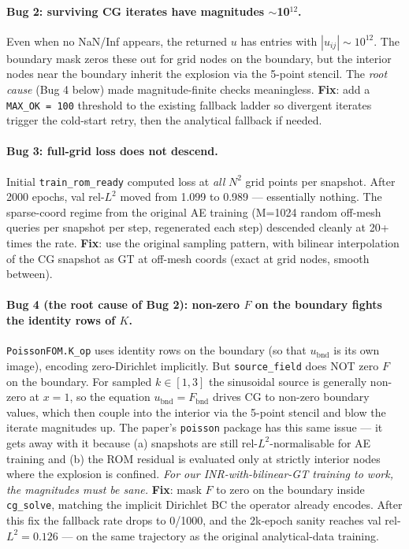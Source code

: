 \documentclass[11pt]{article}
\begin{document}
\paragraph{Bug 2: surviving CG iterates have magnitudes $\sim$10$^{12}$.}
Even when no NaN/Inf appears, the returned $u$ has entries with
$|u_{ij}| \sim 10^{12}$. The boundary mask zeros these out for grid
nodes on the boundary, but the interior nodes near the boundary inherit
the explosion via the 5-point stencil. The \emph{root cause} (Bug 4
below) made magnitude-finite checks meaningless. \textbf{Fix}: add a
\texttt{MAX\_OK = 100} threshold to the existing fallback ladder so
divergent iterates trigger the cold-start retry, then the analytical
fallback if needed.

\paragraph{Bug 3: full-grid loss does not descend.}
Initial \texttt{train\_rom\_ready} computed loss at \emph{all} $N^2$
grid points per snapshot. After 2000 epochs, val rel-$L^2$ moved from
1.099 to 0.989 --- essentially nothing. The sparse-coord regime from
the original AE training (M=1024 random off-mesh queries per snapshot
per step, regenerated each step) descended cleanly at 20+ times the
rate. \textbf{Fix}: use the original sampling pattern, with bilinear
interpolation of the CG snapshot as GT at off-mesh coords (exact at
grid nodes, smooth between).

\paragraph{Bug 4 (the root cause of Bug 2): non-zero $F$ on the
boundary fights the identity rows of $K$.}
\texttt{PoissonFOM.K\_op} uses identity rows on the boundary (so that
$u_{\text{bnd}}$ is its own image), encoding zero-Dirichlet implicitly.
But \texttt{source\_field} does NOT zero $F$ on the boundary. For
sampled $k \in [1, 3]$ the sinusoidal source is generally non-zero at
$x=1$, so the equation $u_{\text{bnd}} = F_{\text{bnd}}$ drives CG to
non-zero boundary values, which then couple into the interior via the
5-point stencil and blow the iterate magnitudes up. The paper's
\texttt{poisson} package has this same issue --- it gets away with it
because (a) snapshots are still rel-$L^2$-normalisable for AE training
and (b) the ROM residual is evaluated only at strictly interior nodes
where the explosion is confined. \emph{For our INR-with-bilinear-GT
training to work, the magnitudes must be sane.} \textbf{Fix}: mask
$F$ to zero on the boundary inside \texttt{cg\_solve}, matching the
implicit Dirichlet BC the operator already encodes. After this fix the
fallback rate drops to 0/1000, and the 2k-epoch sanity reaches val
rel-$L^2 = 0.126$ --- on the same trajectory as the original
analytical-data training.
\end{document}

